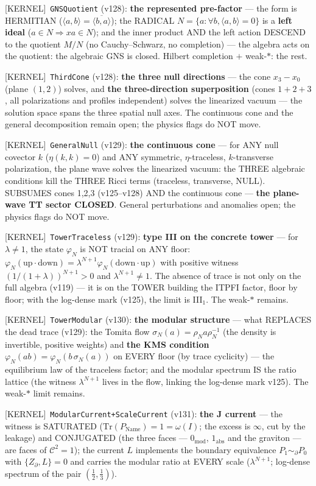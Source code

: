 \documentclass[11pt]{article}
\providecommand{\kernelmk}[1]{\textsf{[KERNEL]}~\texttt{#1}}\providecommand{\knownmk}[1]{\textsf{[KNOWN]}~{#1}}\providecommand{\statusmk}[1]{\textsf{[#1]}}
\theoremstyle{definition}\newtheorem{deriv}{Derivation}
\begin{document}
\kernelmk{GNSQuotient} (v128): \textbf{the represented pre-factor} --- the form is HERMITIAN ($\langle a,b\rangle=\overline{\langle b,a\rangle}$); the RADICAL $N=\{a:\forall b,\langle a,b\rangle=0\}$ is a \textbf{left ideal} ($a\in N\Rightarrow x a\in N$); and the inner product AND the left action DESCEND to the quotient $M/N$ (no Cauchy--Schwarz, no completion) --- the algebra acts on the quotient: the algebraic GNS is closed. Hilbert completion $+$ weak-$*$: the rest.

\kernelmk{ThirdCone} (v128): \textbf{the three null directions} --- the cone $x_3{-}x_0$ (plane $(1,2)$) solves, and \textbf{the three-direction superposition} (cones $1{+}2{+}3$, all polarizations and profiles independent) solves the linearized vacuum --- the solution space spans the three spatial null axes. The continuous cone and the general decomposition remain open; the physics flags do NOT move.

\kernelmk{GeneralNull} (v129): \textbf{the continuous cone} --- for ANY null covector $k$ ($\eta(k,k)=0$) and ANY symmetric, $\eta$-traceless, $k$-transverse polarization, the plane wave solves the linearized vacuum: the THREE algebraic conditions kill the THREE Ricci terms (traceless, transverse, NULL). SUBSUMES cones 1,2,3 (v125--v128) AND the continuous cone --- \textbf{the plane-wave TT sector CLOSED}. General perturbations and anomalies open; the physics flags do NOT move.

\kernelmk{TowerTraceless} (v129): \textbf{type III on the concrete tower} --- for $\lambda\neq1$, the state $\varphi_N$ is NOT tracial on ANY floor: $\varphi_N(\text{up}\cdot\text{down})=\lambda^{N+1}\varphi_N(\text{down}\cdot\text{up})$ with positive witness $(1/(1{+}\lambda))^{N+1}>0$ and $\lambda^{N+1}\neq1$. The absence of trace is not only on the full algebra (v119) --- it is on the TOWER building the ITPFI factor, floor by floor; with the log-dense mark (v125), the limit is III$_1$. The weak-$*$ remains.

\kernelmk{TowerModular} (v130): \textbf{the modular structure} --- what REPLACES the dead trace (v129): the Tomita flow $\sigma_N(a)=\rho_N a\rho_N^{-1}$ (the density is invertible, positive weights) and \textbf{the KMS condition} $\varphi_N(ab)=\varphi_N(b\,\sigma_N(a))$ on EVERY floor (by trace cyclicity) --- the equilibrium law of the traceless factor; and the modular spectrum IS the ratio lattice (the witness $\lambda^{N+1}$ lives in the flow, linking the log-dense mark v125). The weak-$*$ limit remains.

\kernelmk{ModularCurrent+\allowbreak ScaleCurrent} (v131): \textbf{the J current} --- the witness is SATURATED ($\mathrm{Tr}(P_{\mathrm{Name}})=1=\omega(I)$; the excess is $\infty$, cut by the leakage) and CONJUGATED (the three faces --- $0_{\mathrm{mod}}$, $1_{\mathrm{abs}}$ and the graviton --- are faces of $\mathcal{C}^2=1$); the current $L$ implements the boundary equivalence $P_1\sim_\partial P_0$ with $\{Z_\partial,L\}=0$ and carries the modular ratio at EVERY scale ($\lambda^{N+1}$; log-dense spectrum of the pair $(\tfrac12,\tfrac13)$).
\end{document}
